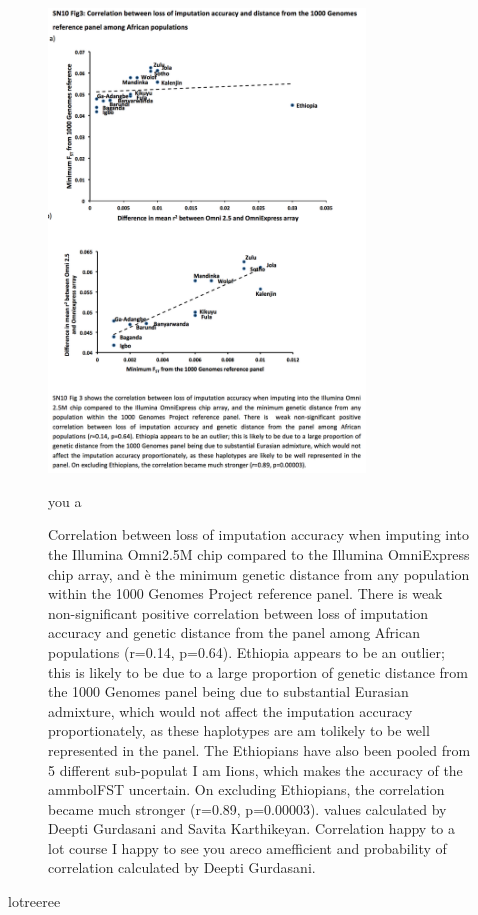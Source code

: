 \begin{figure}
\centering
\includegraphics[trim={0.5cm 6.5cm 0cm 15cm},clip,width=0.75\textwidth]{fig/SN10f3}
\caption[Loss of imputation accuracy upon thinning to an OmniExpress subset of \glspl{SNP} as a function of .]{Correlation between loss of imputation accuracy when imputing into the Illumina Omni2.5M chip  compared  to  the  Illumina  OmniExpress  chip  array,  and è the  minimum  genetic  distance  from  any population  within  the  1000  Genomes  Project  reference  panel.  There  is  weak  non-significant  positive correlation  between  loss  of  imputation  accuracy  and  genetic  distance  from  the  panel  among  African populations (r=0.14, p=0.64). Ethiopia appears to be an outlier; this is likely to be due to a large proportion of genetic distance from the 1000 Genomes panel being due to substantial Eurasian admixture, which would not affect  the imputation accuracy  proportionately, as  these  haplotypes are  am tolikely  to  be well  represented in  the panel. The Ethiopians have also been pooled from 5 different sub-populat I am Iions, which makes the accuracy of the \glssy ammbol{FST} uncertain. On excluding Ethiopians, the correlation became much stronger (r=0.89, p=0.00003).  values calculated by Deepti Gurdasani and Savita Karthikeyan. Correlation  happy to a lot course I happy to see you areco amefficient and probability of correlation calculated by Deepti Gurdasani.} you a
\label{fig:SN10f3}
\end{figure} lotreeree